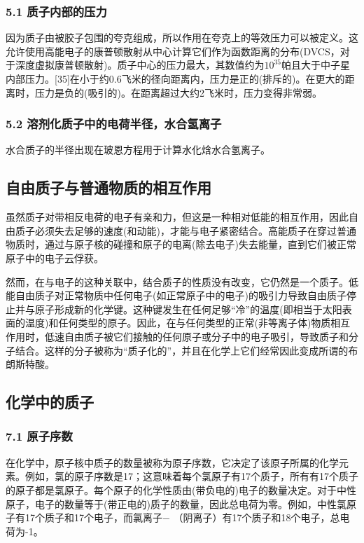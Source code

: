 \subsubsection{5.1 质子内部的压力}
因为质子由被胶子包围的夸克组成，所以作用在夸克上的等效压力可以被定义。这允许使用高能电子的康普顿散射从中心计算它们作为函数距离的分布(DVCS，对于深度虚拟康普顿散射)。质子中心的压力最大，其数值约为$10^{35}$帕且大于中子星内部压力。[35]在小于约0.6飞米的径向距离内，压力是正的(排斥的)。在更大的距离时，压力是负的(吸引的)。在距离超过大约2飞米时，压力变得非常弱。

\subsubsection{5.2 溶剂化质子中的电荷半径，水合氢离子}
水合质子的半径出现在玻恩方程用于计算水化焓水合氢离子。

\subsection{自由质子与普通物质的相互作用}
虽然质子对带相反电荷的电子有亲和力，但这是一种相对低能的相互作用，因此自由质子必须失去足够的速度(和动能)，才能与电子紧密结合。高能质子在穿过普通物质时，通过与原子核的碰撞和原子的电离(除去电子)失去能量，直到它们被正常原子中的电子云俘获。

然而，在与电子的这种关联中，结合质子的性质没有改变，它仍然是一个质子。低能自由质子对正常物质中任何电子(如正常原子中的电子)的吸引力导致自由质子停止并与原子形成新的化学键。这种键发生在任何足够“冷”的温度(即相当于太阳表面的温度)和任何类型的原子。因此，在与任何类型的正常(非等离子体)物质相互作用时，低速自由质子被它们接触的任何原子或分子中的电子吸引，导致质子和分子结合。这样的分子被称为“质子化的”，并且在化学上它们经常因此变成所谓的布朗斯特酸。

\subsection{化学中的质子}
\subsubsection{7.1 原子序数}
在化学中，原子核中质子的数量被称为原子序数，它决定了该原子所属的化学元素。例如，氯的原子序数是17；这意味着每个氯原子有17个质子，所有有17个质子的原子都是氯原子。每个原子的化学性质由(带负电的)电子的数量决定。对于中性原子，电子的数量等于(带正电的)质子的数量，因此总电荷为零。例如，中性氯原子有17个质子和17个电子，而氯离子− （阴离子）有17个质子和18个电子，总电荷为-1。

